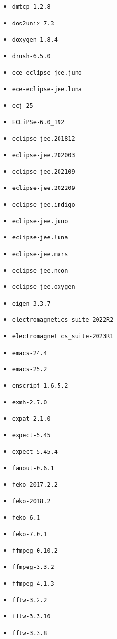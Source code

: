 \begin{multicols}{3}
\begin{itemize}
\item \verb|dmtcp-1.2.8|
\item \verb|dos2unix-7.3|
\item \verb|doxygen-1.8.4|
\item \verb|drush-6.5.0|
\item \verb|ece-eclipse-jee.juno|
\item \verb|ece-eclipse-jee.luna|
\item \verb|ecj-25|
\item \verb|ECLiPSe-6.0_192|
\item \verb|eclipse-jee.201812|
\item \verb|eclipse-jee.202003|
\item \verb|eclipse-jee.202109|
\item \verb|eclipse-jee.202209|
\item \verb|eclipse-jee.indigo|
\item \verb|eclipse-jee.juno|
\item \verb|eclipse-jee.luna|
\item \verb|eclipse-jee.mars|
\item \verb|eclipse-jee.neon|
\item \verb|eclipse-jee.oxygen|
\item \verb|eigen-3.3.7|
\item \verb|electromagnetics_suite-2022R2|
\item \verb|electromagnetics_suite-2023R1|
\item \verb|emacs-24.4|
\item \verb|emacs-25.2|
\item \verb|enscript-1.6.5.2|
\item \verb|exmh-2.7.0|
\item \verb|expat-2.1.0|
\item \verb|expect-5.45|
\item \verb|expect-5.45.4|
\item \verb|fanout-0.6.1|
\item \verb|feko-2017.2.2|
\item \verb|feko-2018.2|
\item \verb|feko-6.1|
\item \verb|feko-7.0.1|
\item \verb|ffmpeg-0.10.2|
\item \verb|ffmpeg-3.3.2|
\item \verb|ffmpeg-4.1.3|
\item \verb|fftw-3.2.2|
\item \verb|fftw-3.3.10|
\item \verb|fftw-3.3.8|

\end{itemize}
\end{multicols}
